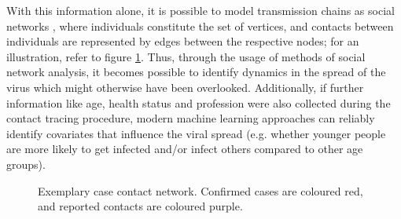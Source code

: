 \documentclass{article}
\begin{document}
	With this information alone, it is possible to model transmission chains as social networks \cite{hainan_publication,shanxi_publication,hancean2022occupations}, where individuals constitute the set of vertices, and contacts between individuals are represented by edges between the respective nodes; for an illustration, refer to figure \ref{fig:example_case_network}. Thus, through the usage of methods of social network analysis, it becomes possible to identify dynamics in the spread of the virus which might otherwise have been overlooked. Additionally, if further information like age, health status and profession were also collected during the contact tracing procedure, modern machine learning approaches can reliably identify covariates that influence the viral spread (e.g. whether younger people are more likely to get infected and/or infect others compared to other age groups).
	
	\begin{figure}
		\centering
		\caption{Exemplary case contact network. Confirmed cases are coloured red, and reported contacts are coloured purple.}
		\label{fig:example_case_network}
	\end{figure}
	
\end{document}
